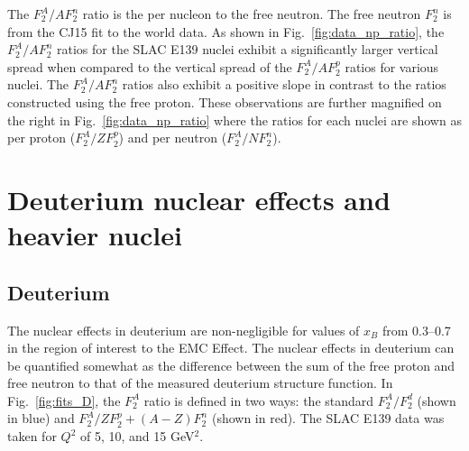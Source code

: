 \documentclass[oneside]{article}
\begin{document}
The $F_2^A/AF_2^n$ ratio is the per nucleon to the free neutron. The free neutron $F_2^n$ is from the CJ15 fit to the world data. As shown in Fig.~\ref{fig:data_np_ratio}, the $F_2^A/AF_2^n$ ratios for the SLAC E139 nuclei exhibit a significantly larger vertical spread when compared to the vertical spread of the $F_2^A/AF_2^p$ ratios for various nuclei. The  $F_2^A/AF_2^n$ ratios also exhibit a positive slope in contrast to the ratios constructed using the free proton. These observations are further magnified on the right in Fig.~\ref{fig:data_np_ratio} where the ratios for each nuclei are shown as per proton ($F_2^A/ZF_2^p$) and per neutron ($F_2^A/NF_2^n$). 
 
\section{Deuterium nuclear effects and heavier nuclei}
\subsection{Deuterium}
The nuclear effects in deuterium are non-negligible for values of $x_B$ from 0.3--0.7 in the region of interest to the EMC Effect. The nuclear effects in deuterium can be quantified somewhat as the difference between the sum of the free proton and free neutron to that of the measured deuterium structure function. In Fig.~\ref{fig:fits_D}, the $F_2^A$ ratio is defined in two ways: the standard $F_2^A/F_2^d$ (shown in blue) and $F_2^A/ZF_2^p+(A-Z)F_2^n$ (shown in red). The SLAC E139 data was taken for $Q^2$ of 5, 10, and 15 GeV$^2$.
\end{document}
